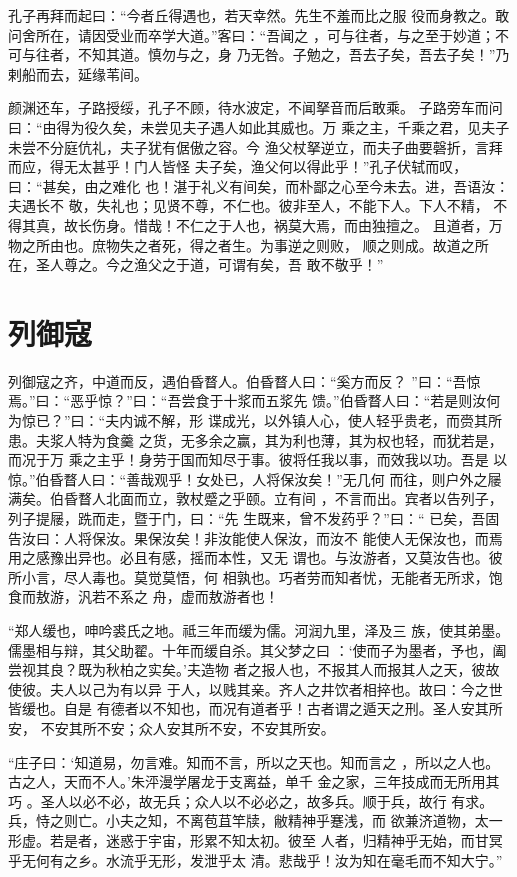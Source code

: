 \documentclass[a4paper,12pt,UTF8,twoside]{ctexbook}
\begin{document}
孔子再拜而起曰：“今者丘得遇也，若天幸然。先生不羞而比之服 役而身教之。敢问舍所在，请因受业而卒学大道。”客曰：“吾闻之 ，可与往者，与之至于妙道；不可与往者，不知其道。慎勿与之，身 乃无咎。子勉之，吾去子矣，吾去子矣！”乃剌船而去，延缘苇间。

颜渊还车，子路授绥，孔子不顾，待水波定，不闻拏音而后敢乘。 子路旁车而问曰：“由得为役久矣，未尝见夫子遇人如此其威也。万 乘之主，千乘之君，见夫子未尝不分庭伉礼，夫子犹有倨傲之容。今 渔父杖拏逆立，而夫子曲要磬折，言拜而应，得无太甚乎！门人皆怪 夫子矣，渔父何以得此乎！”孔子伏轼而叹，曰：“甚矣，由之难化 也！湛于礼义有间矣，而朴鄙之心至今未去。进，吾语汝：夫遇长不 敬，失礼也；见贤不尊，不仁也。彼非至人，不能下人。下人不精， 不得其真，故长伤身。惜哉！不仁之于人也，祸莫大焉，而由独擅之。 且道者，万物之所由也。庶物失之者死，得之者生。为事逆之则败， 顺之则成。故道之所在，圣人尊之。今之渔父之于道，可谓有矣，吾 敢不敬乎！”
\section{列御寇}

列御寇之齐，中道而反，遇伯昏瞀人。伯昏瞀人曰：“奚方而反？ ”曰：“吾惊焉。”曰：“恶乎惊？”曰：“吾尝食于十浆而五浆先 馈。”伯昏瞀人曰：“若是则汝何为惊已？”曰：“夫内诚不解，形 谍成光，以外镇人心，使人轻乎贵老，而赍其所患。夫浆人特为食羹 之货，无多余之赢，其为利也薄，其为权也轻，而犹若是，而况于万 乘之主乎！身劳于国而知尽于事。彼将任我以事，而效我以功。吾是 以惊。”伯昏瞀人曰：“善哉观乎！女处已，人将保汝矣！”无几何 而往，则户外之屦满矣。伯昏瞀人北面而立，敦杖蹙之乎颐。立有间 ，不言而出。宾者以告列子，列子提屦，跣而走，暨于门，曰：“先 生既来，曾不发药乎？”曰：“ 已矣，吾固告汝曰：人将保汝。果保汝矣！非汝能使人保汝，而汝不 能使人无保汝也，而焉用之感豫出异也。必且有感，摇而本性，又无 谓也。与汝游者，又莫汝告也。彼所小言，尽人毒也。莫觉莫悟，何 相孰也。巧者劳而知者忧，无能者无所求，饱食而敖游，汎若不系之 舟，虚而敖游者也！

“郑人缓也，呻吟裘氏之地。祗三年而缓为儒。河润九里，泽及三 族，使其弟墨。儒墨相与辩，其父助翟。十年而缓自杀。其父梦之曰 ：‘使而子为墨者，予也，阖尝视其良？既为秋柏之实矣。’夫造物 者之报人也，不报其人而报其人之天，彼故使彼。夫人以己为有以异 于人，以贱其亲。齐人之井饮者相捽也。故曰：今之世皆缓也。自是 有德者以不知也，而况有道者乎！古者谓之遁天之刑。圣人安其所安， 不安其所不安；众人安其所不安，不安其所安。

“庄子曰：‘知道易，勿言难。知而不言，所以之天也。知而言之 ，所以之人也。古之人，天而不人。’朱泙漫学屠龙于支离益，单千 金之家，三年技成而无所用其巧 。圣人以必不必，故无兵；众人以不必必之，故多兵。顺于兵，故行 有求。兵，恃之则亡。小夫之知，不离苞苴竿牍，敝精神乎蹇浅，而 欲兼济道物，太一形虚。若是者，迷惑于宇宙，形累不知太初。彼至 人者，归精神乎无始，而甘冥乎无何有之乡。水流乎无形，发泄乎太 清。悲哉乎！汝为知在毫毛而不知大宁。”
\end{document}
